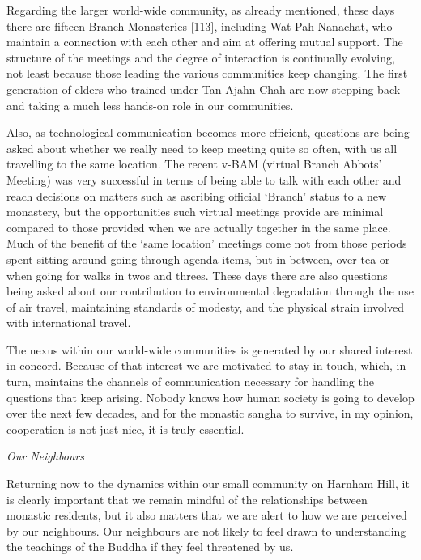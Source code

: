 Regarding the larger world-wide community, as already mentioned, these
days there are
\href{https://forestsangha.org/community/monasteries}{fifteen Branch
Monasteries} {[}113{]}, including Wat Pah Nanachat, who maintain a
connection with each other and aim at offering mutual support. The
structure of the meetings and the degree of interaction is continually
evolving, not least because those leading the various communities keep
changing. The first generation of elders who trained under Tan Ajahn
Chah are now stepping back and taking a much less hands-on role in our
communities.

Also, as technological communication becomes more efficient, questions
are being asked about whether we really need to keep meeting quite so
often, with us all travelling to the same location. The recent v-BAM
(virtual Branch Abbots' Meeting) was very successful in terms of being
able to talk with each other and reach decisions on matters such as
ascribing official `Branch' status to a new monastery, but the
opportunities such virtual meetings provide are minimal compared to
those provided when we are actually together in the same place. Much of
the benefit of the `same location' meetings come not from those periods
spent sitting around going through agenda items, but in between, over
tea or when going for walks in twos and threes. These days there are
also questions being asked about our contribution to environmental
degradation through the use of air travel, maintaining standards of
modesty, and the physical strain involved with international travel.

The nexus within our world-wide communities is generated by our shared
interest in concord. Because of that interest we are motivated to stay
in touch, which, in turn, maintains the channels of communication
necessary for handling the questions that keep arising. Nobody knows how
human society is going to develop over the next few decades, and for the
monastic sangha to survive, in my opinion, cooperation is not just nice,
it is truly essential.

\emph{Our Neighbours}

Returning now to the dynamics within our small community on Harnham
Hill, it is clearly important that we remain mindful of the
relationships between monastic residents, but it also matters that we
are alert to how we are perceived by our neighbours. Our neighbours are
not likely to feel drawn to understanding the teachings of the Buddha if
they feel threatened by us.

